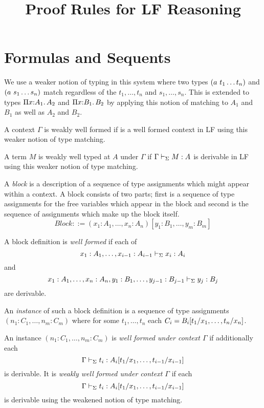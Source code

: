 \documentclass[11pt]{article}
\title{Proof Rules for LF Reasoning}
\begin{document}
\maketitle

\section{Formulas and Sequents}

\begin{definition}[Substitution]
[still to do]
\end{definition}

\begin{definition}
We use a weaker notion of typing in this system where two types
$(a\app t_1\ldots t_n)$ and $(a\app s_1\ldots s_n)$ match regardless
of the $t_1,\ldots,t_n$ and $s_1,\ldots,s_n$.
%
This is extended to types $\typedpi{x}{A_1}{A_2}$ and
$\typedpi{x}{B_1}{B_2}$ by applying this notion of matching to
$A_1$ and $B_1$ as well as $A_2$ and $B_2$.

A context $\Gamma$ is weakly well formed if is a well formed context
in LF using this weaker notion of type matching.

A term $M$ is weakly well typed at $A$ under $\Gamma$ if
$\lfprove{\Gamma}{M:A}$ is derivable in LF using this weaker notion of
type matching.
\end{definition}

\begin{definition}[Block]
A {\it block} is a description of a sequence of type assignments which
might appear within a context.
%
A block consists of two parts; first is a sequence of type assignments
for the free variables which appear in the block and second is the
sequence of assignments which make up the block itself.
%
\[
Block ::= (x_1:A_1,\ldots,x_n:A_n)[y_1:B_1,\ldots,y_m:B_m]
\]

A block definition is {\it well formed} if each of
\[\lfprove{x_1:A_1,\ldots,x_{i-1}:A_{i-1}}{x_i:A_i}\] 
and
\[\lfprove{x_1:A_1,\ldots,x_n:A_n,y_1:B_1,\ldots,y_{j-1}:B_{j-1}}{y_j:B_j}\]
are derivable.
\end{definition}

\begin{definition}
An {\it instance} of such a block definition is a sequence of type
assignments $(n_1:C_1,\ldots,n_m:C_m)$ where for some $t_1,\ldots,t_n$
each $C_i=\subst{t_1/x_1,\ldots,t_n/x_n}{B_i}$.

An instance $(n_1:C_1,\ldots,n_m:C_m)$ is 
{\it well formed under context $\Gamma$} if additionally each 
\[\lfprove{\Gamma}{t_i:\subst{t_1/x_1,\ldots,t_{i-1}/x_{i-1}}{A_i}}\]
is derivable.
%
It is {\it weakly well formed under context $\Gamma$} if each
\[\lfprove{\Gamma}{t_i:\subst{t_1/x_1,\ldots,t_{i-1}/x_{i-1}}{A_i}}\]
is derivable using the weakened notion of type matching.
\end{definition}
\end{document}
